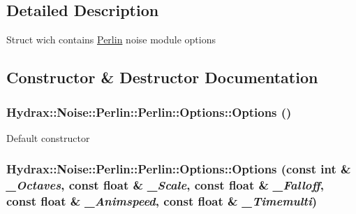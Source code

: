 \subsection{Detailed Description}
Struct wich contains \hyperlink{class_hydrax_1_1_noise_1_1_perlin}{Perlin} noise module options 

\subsection{Constructor \& Destructor Documentation}
\hypertarget{struct_hydrax_1_1_noise_1_1_perlin_1_1_options_357458115476a5b0b9ba11060fb345df}{
\subsubsection[{Options}]{\setlength{\rightskip}{0pt plus 5cm}Hydrax::Noise::Perlin::Perlin::Options::Options ()}}
\label{struct_hydrax_1_1_noise_1_1_perlin_1_1_options_357458115476a5b0b9ba11060fb345df}


Default constructor \hypertarget{struct_hydrax_1_1_noise_1_1_perlin_1_1_options_83c9cc814d0713f1424fbf1e7e4b2f70}{
\subsubsection[{Options}]{\setlength{\rightskip}{0pt plus 5cm}Hydrax::Noise::Perlin::Perlin::Options::Options (const int \& {\em \_\-Octaves}, \/  const float \& {\em \_\-Scale}, \/  const float \& {\em \_\-Falloff}, \/  const float \& {\em \_\-Animspeed}, \/  const float \& {\em \_\-Timemulti})}}
\label{struct_hydrax_1_1_noise_1_1_perlin_1_1_options_83c9cc814d0713f1424fbf1e7e4b2f70}


